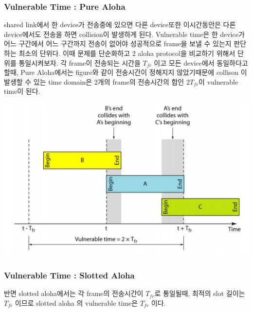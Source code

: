 \begin{multicols}{2}
\subsubsection*{Vulnerable Time : Pure Aloha}
\vspace{-2mm}
shared link에서 한 device가 전송중에 있으면 다른 device또한 이시간동안은 다른 device에서도 전송을 하면 collision이 발생하게 된다. Vulnerable time은 한 device가 어느 구간에서 어느 구간까지 전송이 없어야 성공적으로 frame을 보낼 수 있는지 판단하는 최소의 단위다.
이때 문제를 단순화하고 2 aloha protocol을 비교하기 위해서 단위를 통일시켜보자. 각 frame이 전송되는 시간을 $T_{fr}$  이고 모든 device에서 동일하다고 할때, Pure Aloha에서는  figure와 같이 전송시간이 정해지지 않았기때문에 collison 이 발생할 수 있는 time domain은 2개의 frame의 전송시간의 합인 $2T_{fr}$이 vulnerable time이 된다.\\
    \begin{minipage}{\columnwidth}
    \vspace{2mm}
    \centering%
    \includegraphics[width=.9\textwidth]{image/week12/1-3.png}
    \vspace{-4mm}
    \end{minipage}
\vspace{-2mm}
\subsubsection*{Vulnerable Time : Slotted Aloha}
\vspace{-2mm}
반면 slotted aloha에서는 각 frame의 전송시간이 $T_{fr}$로 통일될때, 최적의 slot 길이는 $T_{fr}$ 이므로 slotted aloha 의 vulnerable time은 $T_{fr}$ 이다.\\
\end{multicols}
\clearpage 
